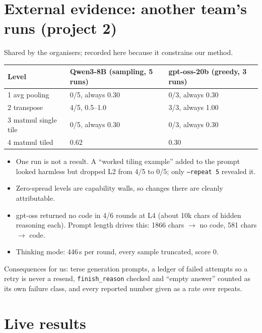 \documentclass[11pt]{article}
\newcommand{\code}[1]{\texttt{#1}}
\begin{document}
\section{External evidence: another team's runs (project 2)}
\label{sec:external}

Shared by the organisers; recorded here because it constrains our method.

\begin{tabular}{@{}lll@{}}
\toprule
Level & Qwen3-8B (sampling, 5 runs) & gpt-oss-20b (greedy, 3 runs) \\
\midrule
1 avg pooling & 0/5, always 0.30 & 0/3, always 0.30 \\
2 transpose & 4/5, 0.5--1.0 & 3/3, always 1.00 \\
3 matmul single tile & 0/5, always 0.30 & 0/3, always 0.30 \\
4 matmul tiled & 0.62 & 0.30 \\
\bottomrule
\end{tabular}

\begin{itemize}
  \item One run is not a result. A ``worked tiling example'' added to the prompt looked
        harmless but dropped L2 from 4/5 to 0/5; only \code{--repeat 5} revealed it.
  \item Zero-spread levels are capability walls, so changes there are cleanly attributable.
  \item gpt-oss returned no code in 4/6 rounds at L4 (about 10k chars of hidden reasoning
        each). Prompt length drives this: 1866 chars $\to$ no code, 581 chars $\to$ code.
  \item Thinking mode: 446\,s per round, every sample truncated, score 0.
\end{itemize}
Consequences for us: terse generation prompts, a ledger of failed attempts so a retry is never
a resend, \code{finish\_reason} checked and ``empty answer'' counted as its own failure class,
and every reported number given as a rate over repeats.

\section{Live results}
\label{sec:results}
\end{document}
